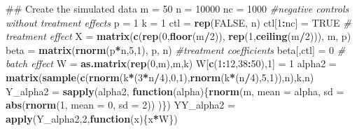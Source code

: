 \documentclass[]{book}
\newenvironment{Shaded}{\begin{snugshade}}{\end{snugshade}}
\newcommand{\KeywordTok}[1]{\textcolor[rgb]{0.13,0.29,0.53}{\textbf{#1}}}
\newcommand{\DataTypeTok}[1]{\textcolor[rgb]{0.13,0.29,0.53}{#1}}
\newcommand{\DecValTok}[1]{\textcolor[rgb]{0.00,0.00,0.81}{#1}}
\newcommand{\StringTok}[1]{\textcolor[rgb]{0.31,0.60,0.02}{#1}}
\newcommand{\CommentTok}[1]{\textcolor[rgb]{0.56,0.35,0.01}{\textit{#1}}}
\newcommand{\OtherTok}[1]{\textcolor[rgb]{0.56,0.35,0.01}{#1}}
\newcommand{\ControlFlowTok}[1]{\textcolor[rgb]{0.13,0.29,0.53}{\textbf{#1}}}
\newcommand{\OperatorTok}[1]{\textcolor[rgb]{0.81,0.36,0.00}{\textbf{#1}}}
\newcommand{\NormalTok}[1]{#1}
\begin{document}
\begin{Shaded}
\begin{Highlighting}[]
\NormalTok{## Create the simulated data}
\NormalTok{m =}\StringTok{ }\DecValTok{50}
\NormalTok{n =}\StringTok{ }\DecValTok{10000}
\NormalTok{nc =}\StringTok{ }\DecValTok{1000} \CommentTok{#negative controls without treatment effects}
\NormalTok{p =}\StringTok{ }\DecValTok{1}
\NormalTok{k =}\StringTok{ }\DecValTok{1}
\NormalTok{ctl =}\StringTok{ }\KeywordTok{rep}\NormalTok{(}\OtherTok{FALSE}\NormalTok{, n)}
\NormalTok{ctl[}\DecValTok{1}\OperatorTok{:}\NormalTok{nc] =}\StringTok{ }\OtherTok{TRUE}
\CommentTok{# treatment effect}
\NormalTok{X =}\StringTok{ }\KeywordTok{matrix}\NormalTok{(}\KeywordTok{c}\NormalTok{(}\KeywordTok{rep}\NormalTok{(}\DecValTok{0}\NormalTok{,}\KeywordTok{floor}\NormalTok{(m}\OperatorTok{/}\DecValTok{2}\NormalTok{)), }\KeywordTok{rep}\NormalTok{(}\DecValTok{1}\NormalTok{,}\KeywordTok{ceiling}\NormalTok{(m}\OperatorTok{/}\DecValTok{2}\NormalTok{))), m, p)}
\NormalTok{beta =}\StringTok{ }\KeywordTok{matrix}\NormalTok{(}\KeywordTok{rnorm}\NormalTok{(p}\OperatorTok{*}\NormalTok{n,}\DecValTok{5}\NormalTok{,}\DecValTok{1}\NormalTok{), p, n) }\CommentTok{#treatment coefficients}
\NormalTok{beta[,ctl] =}\StringTok{ }\DecValTok{0}
\CommentTok{# batch effect}
\NormalTok{W =}\StringTok{ }\KeywordTok{as.matrix}\NormalTok{(}\KeywordTok{rep}\NormalTok{(}\DecValTok{0}\NormalTok{,m),m,k)}
\NormalTok{W[}\KeywordTok{c}\NormalTok{(}\DecValTok{1}\OperatorTok{:}\DecValTok{12}\NormalTok{,}\DecValTok{38}\OperatorTok{:}\DecValTok{50}\NormalTok{),}\DecValTok{1}\NormalTok{] =}\StringTok{  }\DecValTok{1}
\NormalTok{alpha2 =}\StringTok{ }\KeywordTok{matrix}\NormalTok{(}\KeywordTok{sample}\NormalTok{(}\KeywordTok{c}\NormalTok{(}\KeywordTok{rnorm}\NormalTok{(k}\OperatorTok{*}\NormalTok{(}\DecValTok{3}\OperatorTok{*}\NormalTok{n}\OperatorTok{/}\DecValTok{4}\NormalTok{),}\DecValTok{0}\NormalTok{,}\DecValTok{1}\NormalTok{),}\KeywordTok{rnorm}\NormalTok{(k}\OperatorTok{*}\NormalTok{(n}\OperatorTok{/}\DecValTok{4}\NormalTok{),}\DecValTok{5}\NormalTok{,}\DecValTok{1}\NormalTok{)),n),k,n)}
\NormalTok{Y_alpha2 =}\StringTok{ }\KeywordTok{sapply}\NormalTok{(alpha2, }\ControlFlowTok{function}\NormalTok{(alpha)\{}\KeywordTok{rnorm}\NormalTok{(m, }\DataTypeTok{mean =}\NormalTok{  alpha, }\DataTypeTok{sd =} \KeywordTok{abs}\NormalTok{(}\KeywordTok{rnorm}\NormalTok{(}\DecValTok{1}\NormalTok{, }\DataTypeTok{mean =} \DecValTok{0}\NormalTok{, }\DataTypeTok{sd =} \DecValTok{2}\NormalTok{)) )\})}
\NormalTok{YY_alpha2 =}\StringTok{ }\KeywordTok{apply}\NormalTok{(Y_alpha2,}\DecValTok{2}\NormalTok{,}\ControlFlowTok{function}\NormalTok{(x)\{x}\OperatorTok{*}\NormalTok{W\})}


\end{Highlighting}
\end{Shaded}
\end{document}
